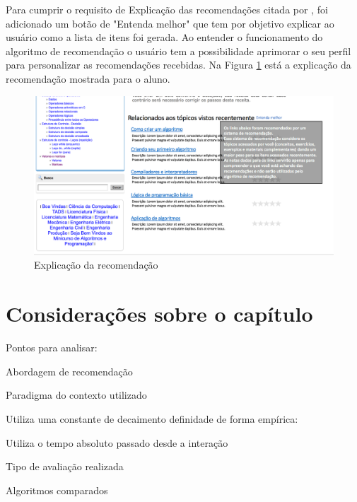 Para cumprir o requisito de Explicação das recomendações citada por , foi adicionado um
botão de "Entenda melhor" que tem por objetivo explicar ao usuário como a lista de itens foi gerada. Ao entender o
funcionamento do algoritmo de recomendação o usuário tem a possibilidade aprimorar o seu perfil para personalizar as
recomendações recebidas. Na Figura \ref{fig:adaptweb-proposta-explicacao} está a explicação da recomendação mostrada para o aluno.

\begin{figure}[htb]
  \caption{\label{fig:adaptweb-proposta-explicacao}Explicação da recomendação}
  \begin{center}
      \includegraphics[scale=0.6]{./Figuras/explicacoes_v2.png}
  \end{center}
\end{figure}

\section{Considerações sobre o capítulo}

Pontos para analisar:

Abordagem de recomendação

Paradigma do contexto utilizado

Utiliza uma constante de decaimento definidade de forma empírica:

Utiliza o tempo absoluto passado desde a interação

Tipo de avaliação realizada

Algoritmos comparados
